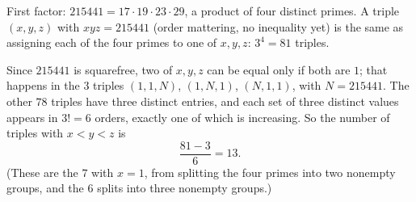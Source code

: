 First factor: $215441=17\cdot19\cdot23\cdot29$, a product of four distinct primes. A triple $(x,y,z)$ with $xyz=215441$ (order mattering, no inequality yet) is the same as assigning each of the four primes to one of $x,y,z$: $3^4=81$ triples.

Since $215441$ is squarefree, two of $x,y,z$ can be equal only if both are $1$; that happens in the $3$ triples $(1,1,N)$, $(1,N,1)$, $(N,1,1)$, with $N=215441$. The other $78$ triples have three distinct entries, and each set of three distinct values appears in $3!=6$ orders, exactly one of which is increasing. So the number of triples with $x<y<z$ is
\[
\dfrac{81-3}{6}=\boxed{13}.
\]
(These are the $7$ with $x=1$, from splitting the four primes into two nonempty groups, and the $6$ splits into three nonempty groups.)
